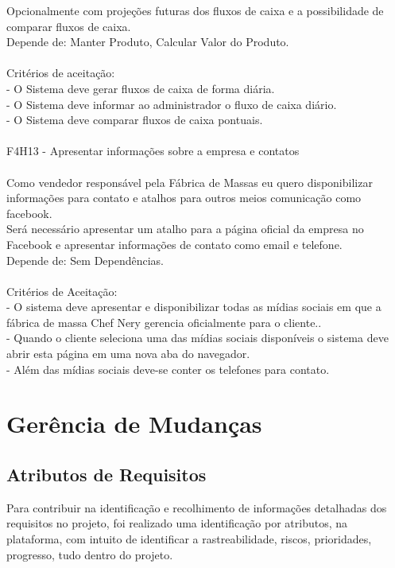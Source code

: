 \tab Opcionalmente com projeções futuras dos fluxos de caixa e a possibilidade de comparar fluxos de caixa.\\
\tab Depende de: Manter Produto, Calcular Valor do Produto.\\
\\
\tab Critérios de aceitação:\\
\tab - O Sistema deve gerar fluxos de caixa de forma diária.\\
\tab - O Sistema deve informar ao administrador o fluxo de caixa diário.\\
\tab - O Sistema deve comparar fluxos de caixa pontuais.\\
\\
F4H13 - Apresentar informações sobre a empresa e contatos\\
\\
\tab Como vendedor responsável pela Fábrica de Massas eu quero disponibilizar informações para contato e atalhos para outros meios comunicação como facebook.\\
\tab Será necessário apresentar um atalho para a página oficial da empresa no Facebook e apresentar informações de contato como email e telefone.\\
\tab Depende de: Sem Dependências.\\
\\
\tab Critérios de Aceitação:\\
\tab - O sistema deve apresentar e disponibilizar todas as mídias sociais em que a fábrica de massa Chef Nery gerencia oficialmente para o cliente.. \\
\tab - Quando o cliente seleciona uma das mídias sociais disponíveis o sistema deve abrir esta página em uma nova aba do navegador.\\
\tab - Além das mídias sociais deve-se conter os telefones para contato.\\


\section{Gerência de Mudanças}

\subsection {Atributos de Requisitos}

Para  contribuir na identificação e recolhimento de informações detalhadas dos requisitos no projeto, foi realizado uma identificação por atributos, na plataforma, com intuito de identificar a rastreabilidade, riscos, prioridades, progresso, tudo dentro do projeto. \\

